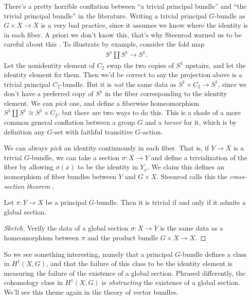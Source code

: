\documentclass[11pt]{amsart}
\begin{document}
\begin{remark} There's a pretty horrible conflation between ``a trivial principal bundle'' and ``the trivial principal bundle'' in the literature. Writing a trivial principal $G$-bundle as $G \times X \to X$ is a very bad practice, since it assumes we know where the identity is in each fiber. A priori we don't know this, that's why Steenrod warned us to be careful about this \cite[pp.37-38]{Steenrod-fibre-bundles}. To illustrate by example, consider the fold map
\begin{align*}
    S^1 \amalg S^1 \to S^1.
\end{align*}
Let the nonidentity element of $C_2$ swap the two copies of $S^1$ upstairs, and let the identity element fix them. Then we'd be correct to say the projection above is a trivial principal $C_2$-bundle. But it is \emph{not} the same data as $S^1 \times C_2 \to S^1$, since we don't have a preferred copy of $S^1$ in the fiber corresponding to the identity element. We can \emph{pick} one, and define a fiberwise homeomorphism $S^1 \amalg S^1 \cong S^1 \times C_2$, but there are two ways to do this. This is a shade of a more common general conflation between a group $G$ and a \emph{torsor} for it, which is by definition any $G$-set with faithful transitive $G$-action.
\end{remark}

We can always \emph{pick} an identity continuously in each fiber. That is, if $Y \to X$ is a trivial $G$-bundle, we can take a section $\sigma \colon X \to Y$ and define a trivialization of the fiber by allowing $\sigma(x)$ to be the identity in $Y_x$. We claim this defines an isomorphism of fiber bundles between $Y$ and $G \times X$. Steenrod calls this the \emph{cross-section theorem} \cite[I.8.3]{Steenrod-fibre-bundles}.

\begin{theorem}
\label{thm:cross-section}
Let $\pi \colon Y \to X$ be a principal $G$-bundle. Then it is trivial if and only if it admits a global section.
\end{theorem}
\begin{proof}[Sketch] Verify the data of a global section $\sigma \colon X \to Y$ is the same data as a homeomorphism between $\pi$ and the product bundle $G \times X \to X$.
\end{proof}

So we see something interesting, namely that a principal $G$-bundle defines a class in $H^1(X,G)$, and that the failure of this class to be the identity element is measuring the failure of the existence of a global section. Phrased differently, the cohomology class in $H^1(X,G)$ is \emph{obstructing} the existence of a global section. We'll see this theme again in the theory of vector bundles.
\end{document}
